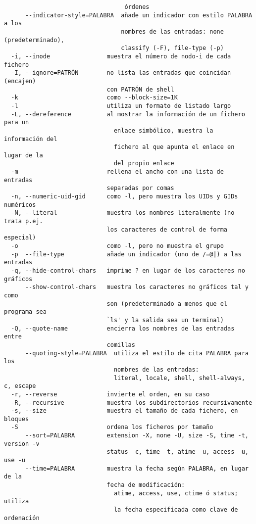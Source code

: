 \begin{verbatim}
                                  órdenes
      --indicator-style=PALABRA  añade un indicador con estilo PALABRA a los
                                 nombres de las entradas: none (predeterminado),
                                 classify (-F), file-type (-p)
  -i, --inode                muestra el número de nodo-i de cada fichero
  -I, --ignore=PATRÓN        no lista las entradas que coincidan (encajen)
                             con PATRÓN de shell
  -k                         como --block-size=1K
  -l                         utiliza un formato de listado largo
  -L, --dereference          al mostrar la información de un fichero para un
                               enlace simbólico, muestra la información del
                               fichero al que apunta el enlace en lugar de la
                               del propio enlace
  -m                         rellena el ancho con una lista de entradas
                             separadas por comas
  -n, --numeric-uid-gid      como -l, pero muestra los UIDs y GIDs numéricos
  -N, --literal              muestra los nombres literalmente (no trata p.ej.
                             los caracteres de control de forma especial)
  -o                         como -l, pero no muestra el grupo
  -p  --file-type            añade un indicador (uno de /=@|) a las entradas
  -q, --hide-control-chars   imprime ? en lugar de los caracteres no gráficos
      --show-control-chars   muestra los caracteres no gráficos tal y como
                             son (predeterminado a menos que el programa sea
                             `ls' y la salida sea un terminal)
  -Q, --quote-name           encierra los nombres de las entradas entre
                             comillas
      --quoting-style=PALABRA  utiliza el estilo de cita PALABRA para los
                               nombres de las entradas:
                               literal, locale, shell, shell-always, c, escape
  -r, --reverse              invierte el orden, en su caso
  -R, --recursive            muestra los subdirectorios recursivamente
  -s, --size                 muestra el tamaño de cada fichero, en bloques
  -S                         ordena los ficheros por tamaño
      --sort=PALABRA         extension -X, none -U, size -S, time -t, version -v
                             status -c, time -t, atime -u, access -u, use -u
      --time=PALABRA         muestra la fecha según PALABRA, en lugar de la
                             fecha de modificación:
                               atime, access, use, ctime ó status; utiliza
                               la fecha especificada como clave de ordenación

\end{verbatim}
